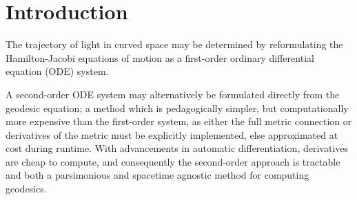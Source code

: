 \section{Introduction}



The trajectory of light in curved space may be determined by reformulating the Hamilton-Jacobi equations of motion as a first-order ordinary differential equation (ODE) system. 

A second-order ODE system may alternatively be formulated directly from the geodesic equation; a method which is pedagogically simpler, but computationally more expensive than the first-order system, as either the full metric connection or derivatives of the metric must be explicitly implemented, else approximated at cost during runtime. With advancements in automatic differentiation, derivatives are cheap to compute, and consequently the second-order approach is tractable and both a parsimonious and spacetime agnostic method for computing geodesics.